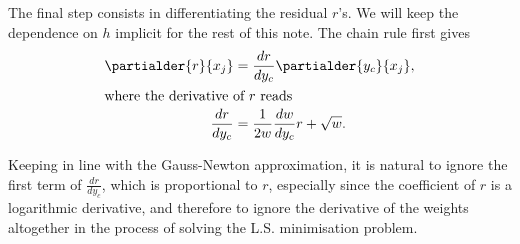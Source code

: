 \documentclass[11pt]{article}
\begin{document}
The final step consists in differentiating the residual $r$'s. We will keep the dependence on $h$ implicit for the rest of this note. The chain rule first gives
\begin{align}
\partialder{r}{x_j} &= \frac{dr}{dy_c}\partialder{y_c}{x_j},\\
\intertext{where the derivative of $r$ reads}
\frac{dr}{dy_c} &= \frac{1}{2w}\frac{dw}{dy_c} r + \sqrt{w}.
\end{align}

Keeping in line with the Gauss-Newton approximation, it is natural to ignore the first term of $\frac{dr}{dy_c}$, which is proportional to $r$, especially since the coefficient of $r$ is a logarithmic derivative, and therefore to ignore the derivative of the weights altogether in the process of solving the L.S. minimisation problem.


\end{document}
